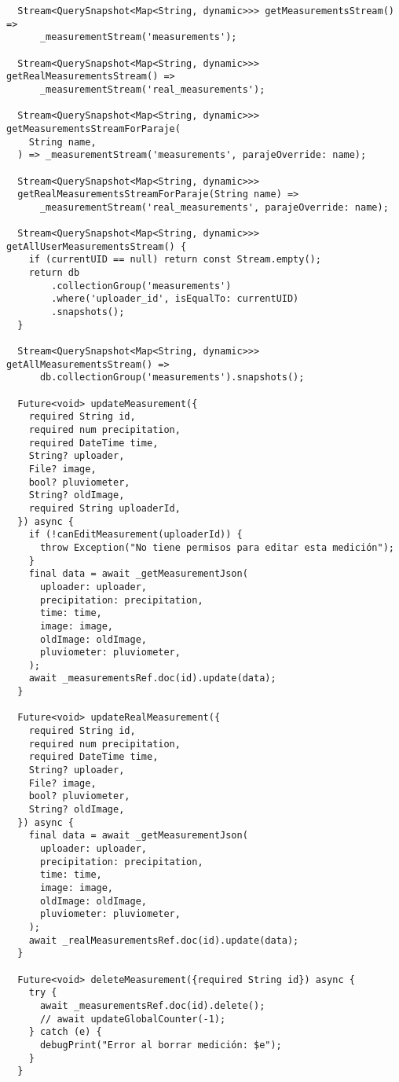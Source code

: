 \begin{verbatim}
  Stream<QuerySnapshot<Map<String, dynamic>>> getMeasurementsStream() =>
      _measurementStream('measurements');

  Stream<QuerySnapshot<Map<String, dynamic>>> getRealMeasurementsStream() =>
      _measurementStream('real_measurements');

  Stream<QuerySnapshot<Map<String, dynamic>>> getMeasurementsStreamForParaje(
    String name,
  ) => _measurementStream('measurements', parajeOverride: name);

  Stream<QuerySnapshot<Map<String, dynamic>>>
  getRealMeasurementsStreamForParaje(String name) =>
      _measurementStream('real_measurements', parajeOverride: name);

  Stream<QuerySnapshot<Map<String, dynamic>>> getAllUserMeasurementsStream() {
    if (currentUID == null) return const Stream.empty();
    return db
        .collectionGroup('measurements')
        .where('uploader_id', isEqualTo: currentUID)
        .snapshots();
  }

  Stream<QuerySnapshot<Map<String, dynamic>>> getAllMeasurementsStream() =>
      db.collectionGroup('measurements').snapshots();

  Future<void> updateMeasurement({
    required String id,
    required num precipitation,
    required DateTime time,
    String? uploader,
    File? image,
    bool? pluviometer,
    String? oldImage,
    required String uploaderId,
  }) async {
    if (!canEditMeasurement(uploaderId)) {
      throw Exception("No tiene permisos para editar esta medición");
    }
    final data = await _getMeasurementJson(
      uploader: uploader,
      precipitation: precipitation,
      time: time,
      image: image,
      oldImage: oldImage,
      pluviometer: pluviometer,
    );
    await _measurementsRef.doc(id).update(data);
  }

  Future<void> updateRealMeasurement({
    required String id,
    required num precipitation,
    required DateTime time,
    String? uploader,
    File? image,
    bool? pluviometer,
    String? oldImage,
  }) async {
    final data = await _getMeasurementJson(
      uploader: uploader,
      precipitation: precipitation,
      time: time,
      image: image,
      oldImage: oldImage,
      pluviometer: pluviometer,
    );
    await _realMeasurementsRef.doc(id).update(data);
  }

  Future<void> deleteMeasurement({required String id}) async {
    try {
      await _measurementsRef.doc(id).delete();
      // await updateGlobalCounter(-1);
    } catch (e) {
      debugPrint("Error al borrar medición: $e");
    }
  }


\end{verbatim}
